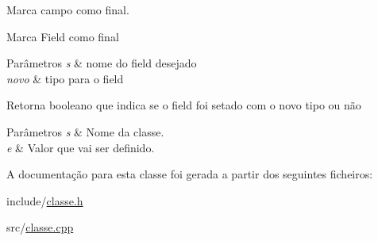 Marca campo como final. 

Marca Field como final 
\begin{DoxyParams}{Parâmetros}
{\em s} & nome do field desejado \\
\hline
{\em novo} & tipo para o field \\
\hline
\end{DoxyParams}
\begin{DoxyReturn}{Retorna}
booleano que indica se o field foi setado com o novo tipo ou não
\end{DoxyReturn}

\begin{DoxyParams}{Parâmetros}
{\em s} & Nome da classe. \\
\hline
{\em e} & Valor que vai ser definido. \\
\hline
\end{DoxyParams}


A documentação para esta classe foi gerada a partir dos seguintes ficheiros\+:\begin{DoxyCompactItemize}
\item 
include/\hyperlink{classe_8h}{classe.\+h}\item 
src/\hyperlink{classe_8cpp}{classe.\+cpp}\end{DoxyCompactItemize}
